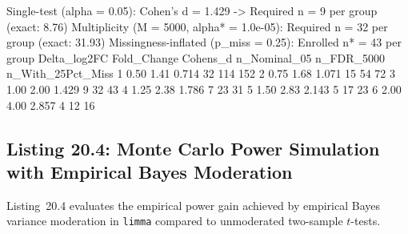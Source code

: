 \documentclass[11pt,twoside,openright]{book}
\begin{document}
\begin{routput}
Single-test (alpha = 0.05): Cohen's d = 1.429 -> Required n = 9 per group (exact: 8.76)
Multiplicity (M = 5000, alpha* = 1.0e-05): Required n = 32 per group (exact: 31.93)
Missingness-inflated (p\_miss = 0.25): Enrolled n* = 43 per group
  Delta\_log2FC Fold\_Change Cohens\_d n\_Nominal\_05 n\_FDR\_5000 n\_With\_25Pct\_Miss
1         0.50        1.41    0.714           32        114               152
2         0.75        1.68    1.071           15         54                72
3         1.00        2.00    1.429            9         32                43
4         1.25        2.38    1.786            7         23                31
5         1.50        2.83    2.143            5         17                23
6         2.00        4.00    2.857            4         12                16
\end{routput}

\subsection{Listing 20.4: Monte Carlo Power Simulation with Empirical Bayes Moderation}

Listing~20.4 evaluates the empirical power gain achieved by empirical Bayes variance moderation in \texttt{limma} compared to unmoderated two-sample $t$-tests.
\end{document}
